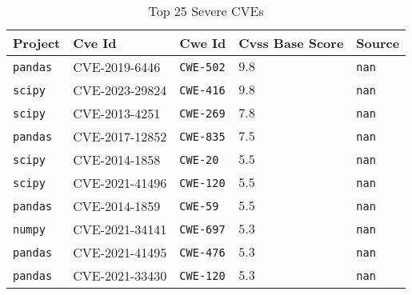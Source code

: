 \begin{table}
\caption{Top 25 Severe CVEs}
\label{tab:most-severe-cwe}
\begin{tabular}{lllll}
\toprule
Project & Cve Id & Cwe Id & Cvss Base Score & Source \\
\midrule
\texttt{pandas} & CVE-2019-6446 & \texttt{CWE-502} & $9.8$ & \texttt{nan} \\
\texttt{scipy} & CVE-2023-29824 & \texttt{CWE-416} & $9.8$ & \texttt{nan} \\
\texttt{scipy} & CVE-2013-4251 & \texttt{CWE-269} & $7.8$ & \texttt{nan} \\
\texttt{pandas} & CVE-2017-12852 & \texttt{CWE-835} & $7.5$ & \texttt{nan} \\
\texttt{scipy} & CVE-2014-1858 & \texttt{CWE-20} & $5.5$ & \texttt{nan} \\
\texttt{scipy} & CVE-2021-41496 & \texttt{CWE-120} & $5.5$ & \texttt{nan} \\
\texttt{pandas} & CVE-2014-1859 & \texttt{CWE-59} & $5.5$ & \texttt{nan} \\
\texttt{numpy} & CVE-2021-34141 & \texttt{CWE-697} & $5.3$ & \texttt{nan} \\
\texttt{pandas} & CVE-2021-41495 & \texttt{CWE-476} & $5.3$ & \texttt{nan} \\
\texttt{pandas} & CVE-2021-33430 & \texttt{CWE-120} & $5.3$ & \texttt{nan} \\
\bottomrule
\end{tabular}
\end{table}
